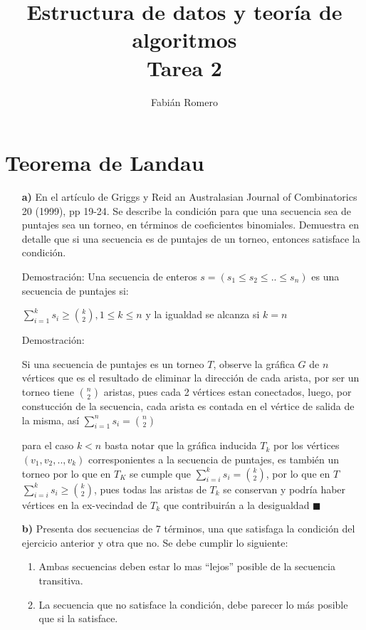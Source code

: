 \documentclass[12pt]{article}
\title{Estructura de datos y teoría de algoritmos\\
Tarea 2 }
\author{Fabián Romero}
\begin{document}
\lstset{language=python}
\maketitle

\section{Teorema de Landau}
\begin{itemize}
  \item[\bf{a)}] En el artículo de Griggs y Reid an Australasian Journal of Combinatorics 20 (1999), pp
19-24. Se describe la condición para que una secuencia sea de puntajes sea un torneo, en términos de coeficientes binomiales. Demuestra en detalle que si una secuencia es de
puntajes de un torneo, entonces satisface la condición.

  \item[Demostración:]
    Una secuencia de enteros $s=(s_1 \le s_2 \le .. \le s_n)$ es una secuencia de puntajes si:

 $\sum\limits_{i=1}^{k} s_i \ge {k \choose 2}, 1 \le k \le n $ y la igualdad se alcanza si $k = n$


    Demostración:

    Si una secuencia de puntajes es un torneo $T$, observe la gráfica $G$ de $n$ vértices que es el resultado de eliminar la dirección de cada arista, por ser un torneo tiene $n \choose 2$ aristas, pues cada 2 vértices estan conectados, luego, por constucción de la secuencia, cada arista es contada en el vértice de salida de la misma, así  $\sum\limits_{i=1}^{n} s_i = {n \choose 2}$ 

    para el caso $k < n$ basta notar que la gráfica inducida $T_k$ por los vértices $(v_1,v_2,..,v_k)$ corresponientes a la secuencia de puntajes, es también un torneo por lo que en $T_K$ se cumple que $\sum\limits_{i=i}^{k} s_i = {k \choose 2}$, por lo que en $T$ $\sum\limits_{i=i}^{k} s_i \ge {k \choose 2}$, pues todas las aristas de $T_k$ se conservan y podría haber vértices en la ex-vecindad de $T_k$ que contribuirán a la desigualdad $\blacksquare$

  \item[\bf{b)}]Presenta dos secuencias de 7 términos, una que satisfaga la condición del ejercicio anterior y otra que no. Se debe cumplir lo siguiente:
\begin{enumerate}
\item Ambas secuencias deben estar lo mas ``lejos'' posible de la secuencia transitiva.
\item La secuencia que no satisface la condición, debe parecer lo más posible que si la satisface.
\end{enumerate}


\end{itemize}
\end{document}
